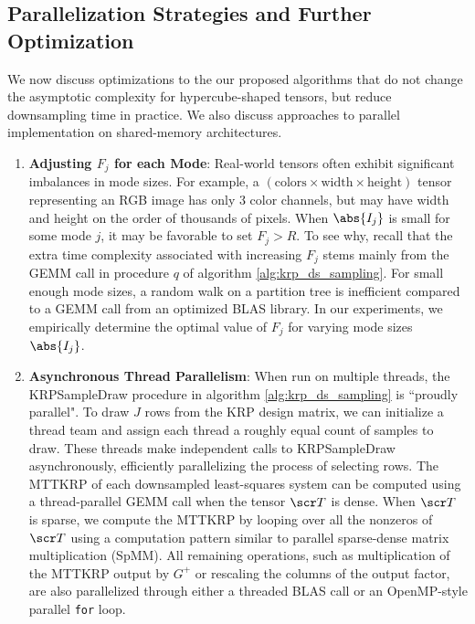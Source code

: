 \subsection{Parallelization Strategies and Further Optimization}
We now discuss optimizations to the our proposed algorithms that do not change the asymptotic complexity for hypercube-shaped tensors, but reduce downsampling time in practice. We also discuss
approaches to parallel implementation on shared-memory architectures. 

\begin{enumerate}
    \item \textbf{Adjusting $F_j$ for each Mode}: Real-world tensors often exhibit significant imbalances in mode sizes. For example, a 
    $(\textrm{colors} \times \textrm{width} \times \textrm{height})$ tensor representing an RGB image
    has only 3 color channels, but may have width and height on the order of thousands of pixels. When $\abs{I_j}$ is small for some mode $j$, it may be favorable to set $F_j > R$. 
    To see why, recall that the extra time complexity associated with increasing $F_j$ stems mainly from the GEMM call in procedure $q$ of 
    algorithm \ref{alg:krp_ds_sampling}. For small enough mode sizes, a random walk on
    a partition tree is inefficient compared to a GEMM call from an optimized BLAS library. In our experiments, we empirically determine the optimal value of $F_j$ for varying mode sizes $\abs{I_j}$.

    \item \textbf{Asynchronous Thread Parallelism}: When run on multiple threads, the KRPSampleDraw procedure in algorithm \ref{alg:krp_ds_sampling} is ``proudly parallel". 
    To draw $J$ rows from the KRP design matrix, we can initialize a thread team and assign each thread a roughly equal count of samples to draw. These threads make independent calls to
    KRPSampleDraw asynchronously, efficiently parallelizing the process of selecting rows. The MTTKRP of each downsampled least-squares system can be computed using a thread-parallel 
    GEMM call when the tensor $\scr T$ is dense. When $\scr T$ is sparse, we compute the MTTKRP by looping over all the nonzeros of $\scr T$ using a computation pattern similar to
    parallel sparse-dense matrix multiplication (SpMM). All remaining operations, such as multiplication of the MTTKRP output by $G^+$ or rescaling the columns of the output factor, are
    also parallelized through either a threaded BLAS call or an OpenMP-style parallel \verb|for| loop.


\end{enumerate}
